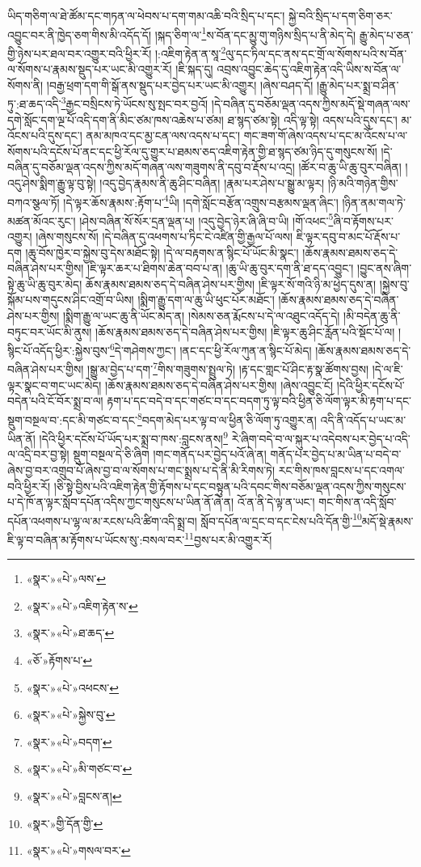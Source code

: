 ཡིད་གཅིག་ལ་ཐེ་ཚོམ་དང་གཏན་ལ་ཕེབས་པ་དག་གམ་འཆི་བའི་སྲིད་པ་དང་། སྐྱེ་བའི་སྲིད་པ་དག་ཅིག་ཅར་འབྱུང་བར་ནི་ཁྱེད་ཅག་གིས་མི་འདོད་དོ། །སྐད་ཅིག་ལ་\footnote{«སྣར་»«པེ་»ལས་}ས་བོན་དང་མྱུ་གུ་གཉིས་སྲིད་པ་ནི་མེད་དེ། རྒྱུ་མེད་པ་ཅན་གྱི་ཉེས་པར་ཐལ་བར་འགྱུར་བའི་ཕྱིར་རོ། །:འཇིག་རྟེན་ན་སཱ་\footnote{«སྣར་»«པེ་»འཇིག་རྟེན་ས་}ལུ་དང་ཏིལ་དང་ནས་དང་གྲོ་ལ་སོགས་པའི་ས་བོན་ལ་སོགས་པ་རྣམས་སྡུད་པར་ཡང་མི་འགྱུར་རོ། །ཇི་སྐད་དུ། འབྲས་འབྱུང་ཆེད་དུ་འཇིག་རྟེན་འདི་ཡིས་ས་བོན་ལ་སོགས་ནི། །བརྒྱ་ཕྲག་དག་གི་སྒོ་ནས་སྡུད་པར་བྱེད་པར་ཡང་མི་འགྱུར། །ཞེས་བཤད་དོ། །རྒྱུ་མེད་པར་སྨྲ་བ་ཤིན་ཏུ་:ཐ་ཆད་འདི་\footnote{«སྣར་»«པེ་»ཐ་ཆད་}རྒྱང་བསྲིངས་ཏེ་ཡོངས་སུ་སྤང་བར་བྱའོ། །དེ་བཞིན་དུ་བཅོམ་ལྡན་འདས་ཀྱིས་མདོ་སྡེ་གཞན་ལས་དགེ་སློང་དག་ལྔ་པོ་འདི་དག་ནི་མིང་ཙམ་ཁས་འཆེས་པ་ཙམ། ཐ་སྙད་ཙམ་སྟེ། འདི་ལྟ་སྟེ། འདས་པའི་དུས་དང་། མ་འོངས་པའི་དུས་དང་། ནམ་མཁའ་དང་མྱ་ངན་ལས་འདས་པ་དང་། གང་ཟག་གོ་ཞེས་འདས་པ་དང་མ་འོངས་པ་ལ་སོགས་པའི་དངོས་པོ་ནང་དང་ཕྱི་རོལ་དུ་གྱུར་པ་ཐམས་ཅད་འཇིག་རྟེན་གྱི་ཐ་སྙད་ཙམ་ཉིད་དུ་གསུངས་སོ། །དེ་བཞིན་དུ་བཅོམ་ལྡན་འདས་ཀྱིས་མདོ་གཞན་ལས་གཟུགས་ནི་དབུ་བ་རྡོས་པ་འདྲ། །ཚོར་བ་ཆུ་ཡི་ཆུ་བུར་བཞིན། །འདུ་ཤེས་སྨིག་རྒྱུ་ལྟ་བུ་སྟེ། །འདུ་བྱེད་རྣམས་ནི་ཆུ་ཤིང་བཞིན། །རྣམ་པར་ཤེས་པ་སྒྱུ་མ་ལྟར། །ཉི་མའི་གཉེན་གྱིས་བཀའ་སྩལ་ཏོ། །དེ་ལྟར་ཆོས་རྣམས་:རྟོག་པ་\footnote{«ཅོ་»རྟོགས་པ་}ཡི། །དགེ་སློང་བརྩོན་འགྲུས་བརྩམས་ལྡན་ཞིང་། །ཉིན་ནམ་གལ་ཏེ་མཚན་མོའང་རུང་། །ཤེས་བཞིན་སོ་སོར་དྲན་ལྡན་པ། །འདུ་བྱེད་ཉེར་ཞི་ཞི་བ་ཡི། །གོ་འཕང་\footnote{«སྣར་»«པེ་»འཕངས་}ཞི་བ་རྟོགས་པར་འགྱུར། །ཞེས་གསུངས་སོ། །དེ་བཞིན་དུ་འཕགས་པ་ཏིང་ངེ་འཛིན་གྱི་རྒྱལ་པོ་ལས། ཇི་ལྟར་དབུ་བ་མང་པོ་རྡོས་པ་དག །ཆུ་བོས་ཁྱེར་བ་སྐྱེས་བུ་དེས་མཐོང་སྟེ། །དེ་ལ་བརྟགས་ན་སྙིང་པོ་ཡོང་མི་སྣང་། །ཆོས་རྣམས་ཐམས་ཅད་དེ་བཞིན་ཤེས་པར་གྱིས། །ཇི་ལྟར་ཆར་པ་ཐིགས་ཆེན་བབ་པ་ན། །ཆུ་ཡི་ཆུ་བུར་དག་ནི་ཐ་དད་འབྱུང་། །བྱུང་ནས་ཞིག་སྟེ་ཆུ་ཡི་ཆུ་བུར་མེད། ཆོས་རྣམས་ཐམས་ཅད་དེ་བཞིན་ཤེས་པར་གྱིས། །ཇི་ལྟར་སོ་གའི་ཉི་མ་ཕྱེད་དུས་ན། །སྐྱེས་བུ་སྐོམ་པས་གདུངས་ཤིང་འགྲོ་བ་ཡིས། །སྨིག་རྒྱུ་དག་ལ་ཆུ་ཡི་ཕུང་པོར་མཐོང་། །ཆོས་རྣམས་ཐམས་ཅད་དེ་བཞིན་ཤེས་པར་གྱིས། །སྨིག་རྒྱུ་ལ་ཡང་ཆུ་ནི་ཡོང་མེད་ན། །སེམས་ཅན་རྨོངས་པ་དེ་ལ་འཐུང་འདོད་དེ། །མི་བདེན་ཆུ་ནི་བཏུང་བར་ཡོང་མི་ནུས། །ཆོས་རྣམས་ཐམས་ཅད་དེ་བཞིན་ཤེས་པར་གྱིས། །ཇི་ལྟར་ཆུ་ཤིང་རློན་པའི་སྡོང་པོ་ལ། །སྙིང་པོ་འདོད་ཕྱིར་:སྐྱེས་བུས་\footnote{«སྣར་»«པེ་»སྐྱེས་བུ་}དེ་གཤེགས་ཀྱང་། །ནང་དང་ཕྱི་རོལ་ཀུན་ན་སྙིང་པོ་མེད། །ཆོས་རྣམས་ཐམས་ཅད་དེ་བཞིན་ཤེས་པར་གྱིས། །སྒྱུ་མ་བྱེད་པ་དག་\footnote{«སྣར་»«པེ་»བདག་}གིས་གཟུགས་སྤྲུལ་ཏེ། །རྟ་དང་གླང་པོ་ཤིང་རྟ་སྣ་ཚོགས་བྱས། །དེ་ལ་ཇི་ལྟར་སྣང་བ་གང་ཡང་མེད། །ཆོས་རྣམས་ཐམས་ཅད་དེ་བཞིན་ཤེས་པར་གྱིས། །ཞེས་འབྱུང་ངོ། །དེའི་ཕྱིར་དངོས་པོ་བདེན་པའི་ངོ་བོར་སྨྲ་བ་ལ། རྟག་པ་དང་བདེ་བ་དང་གཙང་བ་དང་བདག་ཏུ་ལྟ་བའི་ཕྱིན་ཅི་ལོག་ལྟར་མི་རྟག་པ་དང་སྡུག་བསྔལ་བ་:དང་མི་གཙང་བ་དང་\footnote{«སྣར་»«པེ་»མི་གཙང་བ་}བདག་མེད་པར་ལྟ་བ་ལ་ཕྱིན་ཅི་ལོག་ཏུ་འགྱུར་ན། འདི་ནི་འདོད་པ་ཡང་མ་ཡིན་ནོ། །དེའི་ཕྱིར་དངོས་པོ་ཡོད་པར་སྨྲ་བ་ཁས་:བླངས་ནས།\footnote{«སྣར་»«པེ་»བླངས་ན།} རེ་ཞིག་བདེ་བ་ལ་སྐུར་པ་འདེབས་པར་བྱེད་པ་འདི་ལ་འདྲི་བར་བྱ་སྟེ། སྡུག་བསྔལ་དེ་ཅི་ཞིག །གང་གནོད་པར་བྱེད་པའོ་ཞེ་ན། གནོད་པར་བྱེད་པ་མ་ཡིན་པ་བདེ་བ་ཞེས་བྱ་བར་འགྲུབ་པོ་ཞེས་བྱ་བ་ལ་སོགས་པ་གང་སྨྲས་པ་དེ་ནི་མི་རིགས་ཏེ། རང་གིས་ཁས་བླངས་པ་དང་འགལ་བའི་ཕྱིར་རོ། །ཅི་སྟེ་བྱིས་པའི་འཇིག་རྟེན་གྱི་རྟོགས་པ་དང་བསྟུན་པའི་དབང་གིས་བཅོམ་ལྡན་འདས་ཀྱིས་གསུངས་པ་དེ་ཁོ་ན་ལྟར་སློབ་དཔོན་འདིས་ཀྱང་གསུངས་པ་ཡིན་ནོ་ཞེ་ན། འོ་ན་ནི་དེ་ལྟ་ན་ཡང་། གང་གིས་ན་འདི་སློབ་དཔོན་འཕགས་པ་ལྷ་ལ་མ་རངས་པའི་ཚིག་འདི་སྨྲ་བ། སློབ་དཔོན་ལ་དྲང་བ་དང་ངེས་པའི་དོན་གྱི་\footnote{«སྣར་»གྱི་དོན་གྱི་}མདོ་སྡེ་རྣམས་ཇི་ལྟ་བ་བཞིན་མ་རྟོགས་པ་ཡོངས་སུ་:བསལ་བར་\footnote{«སྣར་»«པེ་»གསལ་བར་}བྱས་པར་མི་འགྱུར་རོ། 